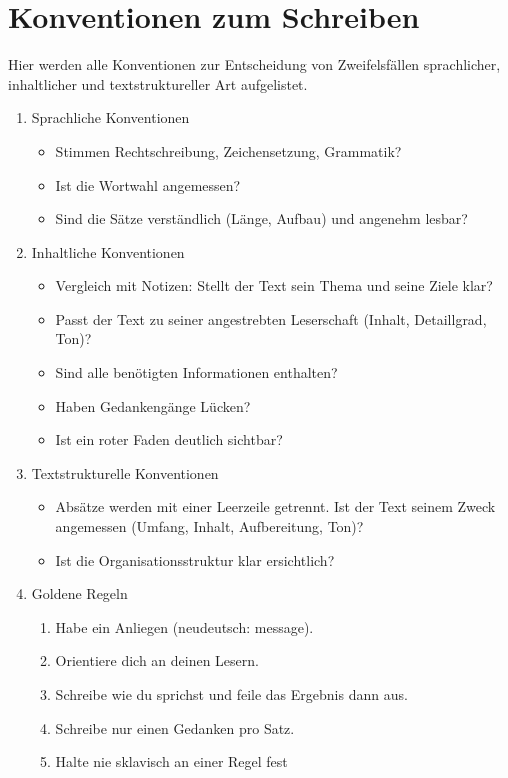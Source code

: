 \documentclass[pdftex,a4paper,12pt]{scrartcl}
\begin{document}
\section{Konventionen zum Schreiben}
Hier werden alle Konventionen zur Entscheidung von Zweifelsfällen sprachlicher, inhaltlicher und textstruktureller Art aufgelistet.
\begin{enumerate}

	\item Sprachliche Konventionen
	\begin{itemize}
	\item Stimmen Rechtschreibung, Zeichensetzung, Grammatik?
	\item Ist die Wortwahl angemessen?
	\item Sind die Sätze verständlich (Länge, Aufbau) und angenehm lesbar?
	\end{itemize}
	
	\item Inhaltliche Konventionen
	\begin{itemize}
	\item Vergleich mit Notizen: Stellt der Text sein Thema und seine Ziele klar?
	\item Passt der Text zu seiner angestrebten Leserschaft (Inhalt, Detaillgrad, Ton)?
	\item Sind alle benötigten Informationen enthalten?
	\item Haben Gedankengänge Lücken?
	\item Ist ein roter Faden deutlich sichtbar?
	\end{itemize}
	
	\item Textstrukturelle Konventionen
	\begin{itemize}
	\item Absätze werden mit einer Leerzeile getrennt.
	\iten Ist der Text seinem Zweck angemessen (Umfang, Inhalt, Aufbereitung, Ton)?
	\item Ist die Organisationsstruktur klar ersichtlich?
	\end{itemize}
	
	\item Goldene Regeln
	\begin{enumerate}
	\item Habe ein Anliegen (neudeutsch: message).
	\item Orientiere dich an deinen Lesern.
	\item Schreibe wie du sprichst und feile das Ergebnis dann aus.
	\item Schreibe nur einen Gedanken pro Satz.
	\item Halte nie sklavisch an einer Regel fest
	\end{enumerate}

\end{enumerate}

	
	
\end{document}
